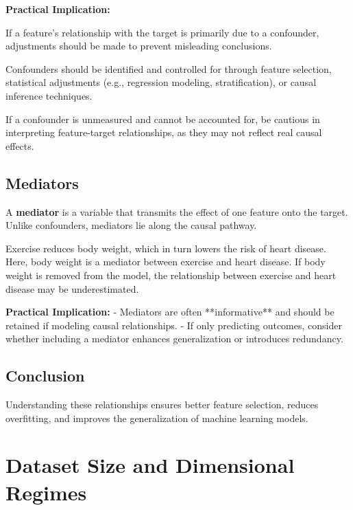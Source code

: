 \documentclass[12pt,openany]{book}
\begin{document}
\textbf{Practical Implication:}

If a feature’s relationship with the target is primarily due to a confounder, adjustments should be made to prevent misleading conclusions.
\newline

Confounders should be identified and controlled for through feature selection, statistical adjustments (e.g., regression modeling, stratification), or causal inference techniques.
\newline

If a confounder is unmeasured and cannot be accounted for, be cautious in interpreting feature-target relationships, as they may not reflect real causal effects.

\subsection{Mediators}

A \textbf{mediator} is a variable that transmits the effect of one feature onto the target. Unlike confounders, mediators lie along the causal pathway.

\begin{examplebox}
Exercise reduces body weight, which in turn lowers the risk of heart disease. Here, body weight is a mediator between exercise and heart disease. If body weight is removed from the model, the relationship between exercise and heart disease may be underestimated.
\end{examplebox}

\textbf{Practical Implication:}
- Mediators are often **informative** and should be retained if modeling causal relationships.
- If only predicting outcomes, consider whether including a mediator enhances generalization or introduces redundancy.

\subsection{Conclusion}

Understanding these relationships ensures better feature selection, reduces overfitting, and improves the generalization of machine learning models.



\section{Dataset Size and Dimensional Regimes}
\end{document}

